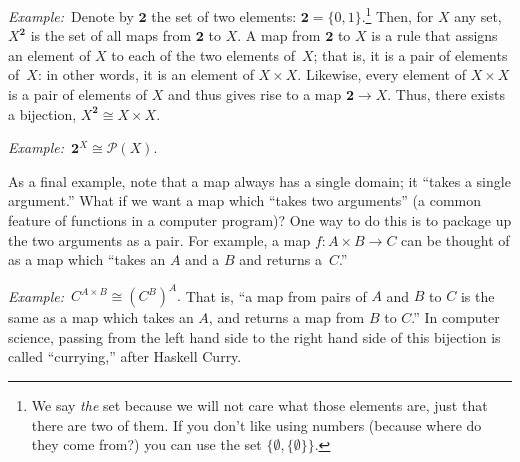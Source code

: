 \documentclass[12pt, a4paper]{article}
\newcommand{\set}[1]{\mathbold{#1}}
\newcommand{\eg}{\emph{Example:}\relax}
\begin{document}
\eg\ Denote by $\set{2}$ the set of two elements:
$\set{2} = \{0,1\}$.\footnote{We say \emph{the} set because we will not
care what those elements are, just that there are two of them. If you
don't like using numbers (because where do they come from?) you can
use the set $\{\emptyset, \{\emptyset\}\}$.} Then, for $X$ any set, $X^\set{2}$ is the
set of all maps from $\set{2}$ to $X$. A map from $\set{2}$ to $X$ is
a rule that assigns an element of $X$ to each of the two elements
of~$X$; that is, it is a pair of elements of~$X$: in other words,
it is an element of $X\times X$. Likewise, every element of $X\times X$ is a
pair of elements of $X$ and thus gives rise to a map $\set{2}\to
X$. Thus, there exists a bijection, $X^\set{2} \cong X\times X$.

\eg\ $\set{2}^X \cong \mathcal{P}(X)$. 

As a final example, note that a map always has a single domain;
it “takes a single argument.” What if we want a map which “takes two
arguments” (a common feature of functions in a computer program)? One
way to do this is to package up the two arguments as a pair. For
example, a map $f:A\times B\to C$ can be thought of as a map which “takes an
$A$ and a $B$ and returns a~$C$.”

\eg\ $C^{A\times B} \cong (C^B)^A.$ That is, “a map from pairs of $A$ and $B$ to
$C$ is the same as a map which takes an $A$, and returns a map from
$B$ to $C$.” In computer science, passing from the left hand side to
the right hand side of this bijection is called “currying,” after
Haskell Curry.
\end{document}
